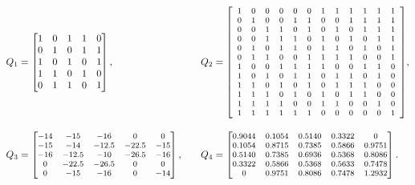 \documentclass[12pt]{article}
\theoremstyle{remark}
\begin{document}
\begin{alignat*}{4}
Q_1 &= \begin{bmatrix}
1 & 0 & 1 & 1 & 0 \\
0 & 1 & 0 & 1 & 1 \\
1 & 0 & 1 & 0 & 1 \\
1 & 1 & 0 & 1 & 0 \\
0 & 1 & 1 & 0 & 1
\end{bmatrix},
&\quad
Q_2 &= {\footnotesize \left[\begin{array}{llllllllllll}
1 & 0 & 0 & 0 & 0 & 0 & 1 & 1 & 1 & 1 & 1 & 1 \\
0 & 1 & 0 & 0 & 1 & 1 & 0 & 0 & 1 & 1 & 1 & 1 \\
0 & 0 & 1 & 1 & 0 & 1 & 0 & 1 & 0 & 1 & 1 & 1 \\
0 & 0 & 1 & 1 & 1 & 0 & 1 & 0 & 1 & 0 & 1 & 1 \\
0 & 1 & 0 & 1 & 1 & 0 & 1 & 1 & 0 & 1 & 0 & 1 \\
0 & 1 & 1 & 0 & 0 & 1 & 1 & 1 & 1 & 0 & 0 & 1 \\
1 & 0 & 0 & 1 & 1 & 1 & 1 & 0 & 0 & 1 & 1 & 0 \\
1 & 0 & 1 & 0 & 1 & 1 & 0 & 1 & 1 & 0 & 1 & 0 \\
1 & 1 & 0 & 1 & 0 & 1 & 0 & 1 & 1 & 1 & 0 & 0 \\
1 & 1 & 1 & 0 & 1 & 0 & 1 & 0 & 1 & 1 & 0 & 0 \\
1 & 1 & 1 & 1 & 0 & 0 & 1 & 1 & 0 & 0 & 1 & 0 \\
1 & 1 & 1 & 1 & 1 & 1 & 0 & 0 & 0 & 0 & 0 & 1
\end{array}\right]},
\\[1em]
{Q_3} &= {\footnotesize \begin{bmatrix}
-14 & -15 & -16 & 0 & 0 \\
-15 & -14 & -12.5 & -22.5 & -15 \\
-16 & -12.5 & -10 & -26.5 & -16 \\
0 & -22.5 & -26.5 & 0 & 0 \\
0 & -15 & -16 & 0 & -14
\end{bmatrix},}
&\quad
{ Q_4} &= {\footnotesize \begin{bmatrix}
0.9044 & 0.1054 & 0.5140 & 0.3322 & 0 \\
0.1054 & 0.8715 & 0.7385 & 0.5866 & 0.9751 \\
0.5140 & 0.7385 & 0.6936 & 0.5368 & 0.8086 \\
0.3322 & 0.5866 & 0.5368 & 0.5633 & 0.7478 \\
0 & 0.9751 & 0.8086 & 0.7478 & 1.2932
\end{bmatrix}.}
\end{alignat*}
\end{document}
